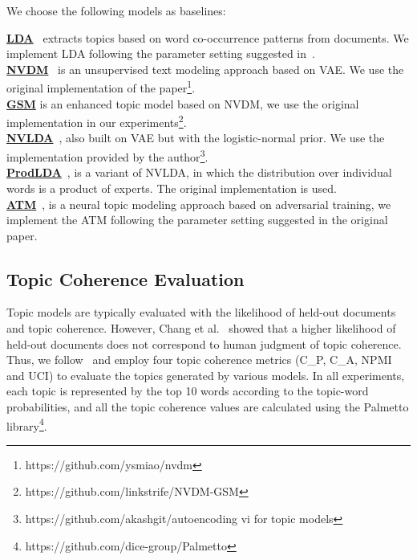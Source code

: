 \documentclass[11pt,a4paper]{article}
\begin{document}
We choose the following models as baselines:

\noindent\underline{\textbf{LDA}}~\cite{blei2003latent} extracts topics based on word co-occurrence patterns from documents. We implement LDA following the parameter setting suggested in~\cite{griffiths2004finding}.\\
\noindent\underline{\textbf{NVDM}}~\cite{miao2016neural} is an unsupervised text modeling approach based on VAE. We use the original implementation of the paper\footnote{https://github.com/ysmiao/nvdm}.\\
{\color{black}\noindent\underline{\textbf{GSM}}\cite{miao2017discovering} is an enhanced topic model based on NVDM, we use the original implementation in our experiments\footnote{https://github.com/linkstrife/NVDM-GSM}. }\\
\noindent\underline{\textbf{NVLDA}}~\cite{srivastava2017autoencoding}, also built on VAE but with the logistic-normal prior. We use the implementation provided by the author\footnote{https://github.com/akashgit/autoencoding vi for topic models\label{vae_lda}}.\\
\noindent\underline{\textbf{ProdLDA}}~\cite{srivastava2017autoencoding}, is a variant of NVLDA, in which the distribution over individual words is a product of experts. The original implementation is used. \\
{\color{black}\noindent\underline{\textbf{ATM}}~\cite{wang2019atm}, is a neural topic modeling approach based on adversarial training, we implement the ATM following the parameter setting suggested in the original paper. 
}

\subsection{Topic Coherence Evaluation}

Topic models are typically evaluated with the likelihood of held-out documents and topic coherence. However, Chang et al.~ showed that a higher likelihood of held-out documents does not correspond to human judgment of topic coherence. Thus, we follow~\cite{roder2015exploring} and employ four topic coherence metrics (C\_P, C\_A, NPMI and UCI) to evaluate the topics generated by various models.
In all experiments, each topic is represented by the top 10 words according to the topic-word probabilities, and all the topic coherence values are calculated using the Palmetto library\footnote{https://github.com/dice-group/Palmetto}.
\end{document}
